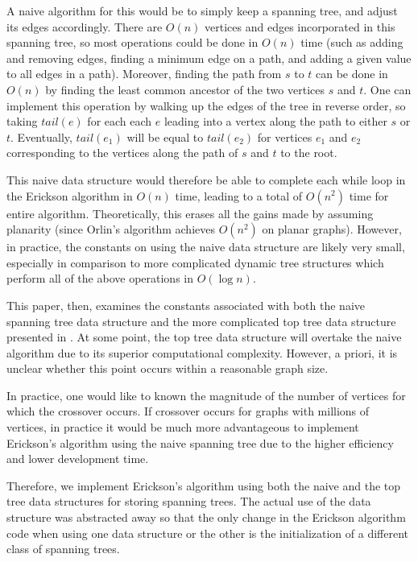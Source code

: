\documentclass[12pt]{article}
\begin{document}
A naive algorithm for this would be to simply keep a spanning tree, and adjust its edges accordingly. There are $O(n)$ vertices and edges incorporated in this spanning tree, so most operations could be done in $O(n)$ time (such as adding and removing edges, finding a minimum edge on a path, and adding a given value to all edges in a path). Moreover, finding the path from $s$ to $t$ can be done in $O(n)$ by finding the least common ancestor of the two vertices $s$ and $t$. One can implement this operation by walking up the edges of the tree in reverse order, so taking $tail(e)$ for each each $e$ leading into a vertex along the path to either $s$ or $t$. Eventually, $tail(e_1)$ will be equal to $tail(e_2)$ for vertices $e_1$ and $e_2$ corresponding to the vertices along the path of $s$ and $t$ to the root. 

This naive data structure would therefore be able to complete each while loop in the Erickson algorithm in $O(n)$ time, leading to a total of $O(n^2)$ time for entire algorithm. Theoretically, this erases all the gains made by assuming planarity (since Orlin's algorithm achieves $O(n^2)$ on planar graphs). However, in practice, the constants on using the naive data structure are likely very small, especially in comparison to more complicated dynamic tree structures which perform all of the above operations in $O(\log n)$. 

This paper, then, examines the constants associated with both the naive spanning tree data structure and the more complicated top tree data structure presented in \cite{tarjanwerneck2005}. At some point, the top tree data structure will overtake the naive algorithm due to its superior computational complexity. However, a priori, it is unclear whether this point occurs within a reasonable graph size.  

In practice, one would like to known the magnitude of the number of vertices for which the crossover occurs. If crossover occurs for graphs with millions of vertices, in practice it would be much more advantageous to implement Erickson's algorithm using the naive spanning tree due to the higher efficiency and lower development time. 

Therefore, we implement Erickson's algorithm using both the naive and the top tree data structures for storing spanning trees. The actual use of the data structure was abstracted away so that the only change in the Erickson algorithm code when using one data structure or the other is the initialization of a different class of spanning trees.
\end{document}
